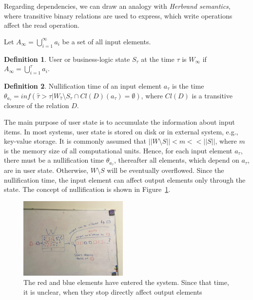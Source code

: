 \documentclass[sigconf]{acmart}
\theoremstyle{definition}
\newtheorem{definition}{Definition}
\begin{document}
Regarding dependencies, we can draw an analogy with {\em Herbrand semantics}, where transitive binary relations are used to express, which write operations affect the read operation.

Let $A_{\infty}=\bigcup\limits_{i=1}^{\infty}{a_i}$ be a set of all input elements.

\begin{definition}{User or business-logic state}
$S_\tau$ at the time $\tau$ is $W_{\infty}$ if $A_{\infty}=\bigcup\limits_{i=1}^{\tau}{a_i}$.
\end{definition}

\begin{definition}{Nullification time}
of an input element $a_\tau$ is the time $\theta_{a_\tau}=inf(\hat{\tau}>\tau|W_{\hat{\tau}}\setminus{S_{\hat{\tau}}}\cap{Cl(D)(a_\tau)=\emptyset})$, where $Cl(D)$ is a transitive closure of the relation $D$.
\end{definition}

The main purpose of user state is to accumulate the information about input items. In most systems, user state is stored on disk or in external system, e.g., key-value storage. It is commonly assumed that $||{W}\setminus{S}||<m<<||S||$, where $m$ is the memory size of all computational units. Hence, for each input element $a_\tau$, there must be a nullification time $\theta_{a_\tau}$, thereafter all elements, which depend on $a_\tau$, are in user state. Otherwise, $W\setminus{S}$ will be eventually overflowed. Since the nullification time, the input element can affect output elements only through the state. The concept of nullification is shown in Figure~\ref{nullification}.   

\begin{figure}[htbp]
  \centering
  \includegraphics[width=0.48\textwidth]{pics/nullification}
  \caption{The red and blue elements have entered the system. Since that time, it is unclear, when they stop directly affect output elements}
  \label {nullification}
\end{figure}
\end{document}
